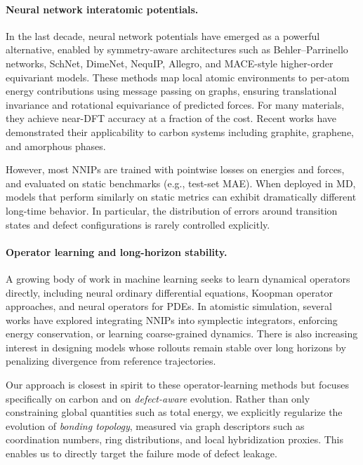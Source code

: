 \documentclass{article}
\begin{document}
\paragraph{Neural network interatomic potentials.}
In the last decade, neural network potentials have emerged as a powerful alternative, enabled by symmetry-aware architectures such as Behler--Parrinello networks, SchNet, DimeNet, NequIP, Allegro, and MACE-style higher-order equivariant models. These methods map local atomic environments to per-atom energy contributions using message passing on graphs, ensuring translational invariance and rotational equivariance of predicted forces. For many materials, they achieve near-DFT accuracy at a fraction of the cost. Recent works have demonstrated their applicability to carbon systems including graphite, graphene, and amorphous phases.

However, most NNIPs are trained with pointwise losses on energies and forces, and evaluated on static benchmarks (e.g., test-set MAE). When deployed in MD, models that perform similarly on static metrics can exhibit dramatically different long-time behavior. In particular, the distribution of errors around transition states and defect configurations is rarely controlled explicitly.

\paragraph{Operator learning and long-horizon stability.}
A growing body of work in machine learning seeks to learn dynamical operators directly, including neural ordinary differential equations, Koopman operator approaches, and neural operators for PDEs. In atomistic simulation, several works have explored integrating NNIPs into symplectic integrators, enforcing energy conservation, or learning coarse-grained dynamics. There is also increasing interest in designing models whose rollouts remain stable over long horizons by penalizing divergence from reference trajectories.

Our approach is closest in spirit to these operator-learning methods but focuses specifically on carbon and on \emph{defect-aware} evolution. Rather than only constraining global quantities such as total energy, we explicitly regularize the evolution of \emph{bonding topology}, measured via graph descriptors such as coordination numbers, ring distributions, and local hybridization proxies. This enables us to directly target the failure mode of defect leakage.
\end{document}
